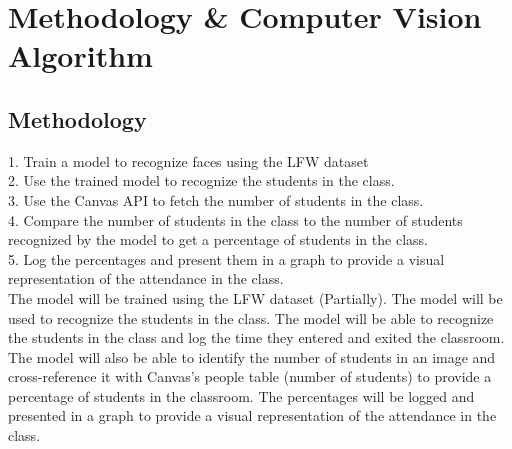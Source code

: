 \section{Methodology \& Computer Vision Algorithm}
\label{sec:method}
\subsection{Methodology}
\label{subsec:method}
1. Train a model to recognize faces using the LFW dataset\\
2. Use the trained model to recognize the students in the class.\\
3. Use the Canvas API to fetch the number of students in the class.\\
4. Compare the number of students in the class to the number of students recognized by the model to get a percentage of students in the class.\\
5. Log the percentages and present them in a graph to provide a visual representation of the attendance in the class.\\

The model will be trained using the LFW dataset (Partially). The model will be used to recognize the students in the class. The model will be able to recognize the students in the class and log the time they entered and exited the classroom. The model will also be able to identify the number of students in an image and cross-reference it with Canvas's people table (number of students) to provide a percentage of students in the classroom. The percentages will be logged and presented in a graph to provide a visual representation of the attendance in the class.\\ 
